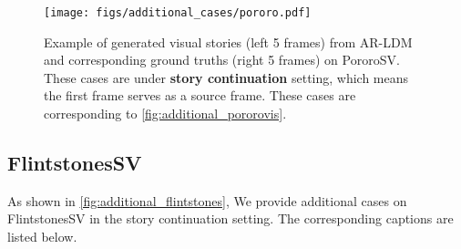 \documentclass[10pt,twocolumn,letterpaper]{article}
\begin{document}
\begin{figure*}[!th]
\centering
\texttt{[image: figs/additional\_cases/pororo.pdf]}
\caption{Example of generated visual stories (left 5 frames) from AR-LDM and corresponding ground truths (right 5 frames) on PororoSV. These cases are under \textbf{story continuation} setting, which means the first frame serves as a source frame. These cases are corresponding to \cref{fig:additional_pororovis}.}
\label{fig:additional_pororo}
\end{figure*}
\clearpage

\subsection{FlintstonesSV}
As shown in \cref{fig:additional_flintstones}, We provide additional cases on FlintstonesSV in the story continuation setting. The corresponding captions are listed below.
\end{document}
